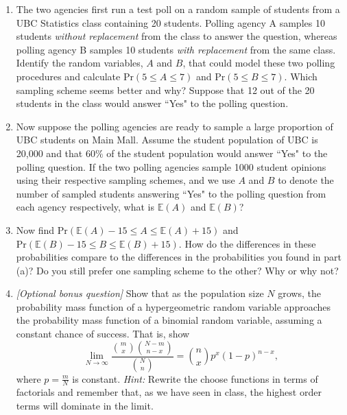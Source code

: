 \documentclass[11pt]{article}
\newcommand{\pr}{\text{Pr}}
\newcommand{\e}{\mathbb{E}}
\begin{document}
\begin{enumerate}[label=\textbf{Q \arabic*:},start=1]
\begin{enumerate}
  \item The two agencies first run a test poll on a random sample of students from a UBC Statistics class containing 20 students. Polling agency A samples 10 students {\em without replacement} from the class to answer the question, whereas polling agency B samples 10 students {\em with replacement} from the same class. Identify the random variables, $A$ and $B$, that could model these two polling procedures and calculate $\pr(5\leq A\leq 7)$ and $\pr(5\leq B\leq 7)$. Which sampling scheme seems better and why? Suppose that 12 out of the 20 students in the class would answer ``Yes" to the polling question.\\

  \item Now suppose the polling agencies are ready to sample a large proportion of UBC students on Main Mall. Assume the student population of UBC is 20,000 and that $60\%$ of the student population would answer ``Yes" to the polling question. If the two polling agencies sample 1000 student opinions using their respective sampling schemes, and we use $A$ and $B$ to denote the number of sampled students answering ``Yes" to the polling question from each agency respectively, what is $\e(A)$ and $\e(B)$?\\

  \item Now find $\pr(\e(A) - 15 \leq A \leq \e(A) + 15)$ and $\pr(\e(B) - 15 \leq B \leq \e(B) + 15)$. How do the differences in these probabilities compare to the differences in the probabilities you found in part (a)? Do you still prefer one sampling scheme to the other? Why or why not?\\

  \item {\em [Optional bonus question]} Show that as the population size $N$ grows, the probability mass function of a hypergeometric random variable approaches the probability mass function of a binomial random variable, assuming a constant chance of success. That is, show $$\lim_{N\rightarrow\infty} \frac { {m \choose x}{N-m \choose n-x}}{ {N\choose n}} = {n\choose x} p^x (1-p)^{n-x},$$ where $p = \frac mN$ is constant. {\em Hint:} Rewrite the choose functions in terms of factorials and remember that, as we have seen in class, the highest order terms will dominate in the limit.
\end{enumerate}





\end{enumerate}
\end{document}
